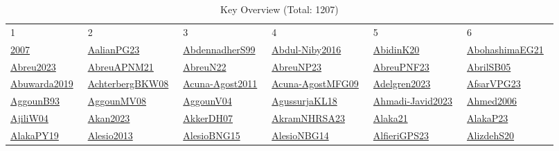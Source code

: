 \begin{longtable}{*{6}{l}}
\rowcolor{white}\caption{Key Overview (Total: 1207)}\\ \toprule
\rowcolor{white}1 & 2 & 3 & 4 & 5 & 6\\ \midrule
\endhead
\bottomrule
\endfoot
\href{../}{2007}~\cite{2007} & \href{../works/AalianPG23.pdf}{AalianPG23}~\cite{AalianPG23} & \href{../works/AbdennadherS99.pdf}{AbdennadherS99}~\cite{AbdennadherS99} & \href{../}{Abdul-Niby2016}~\cite{Abdul-Niby2016} & \href{../works/AbidinK20.pdf}{AbidinK20}~\cite{AbidinK20} & \href{../works/AbohashimaEG21.pdf}{AbohashimaEG21}~\cite{AbohashimaEG21}\\ 
\href{../}{Abreu2023}~\cite{Abreu2023} & \href{../works/AbreuAPNM21.pdf}{AbreuAPNM21}~\cite{AbreuAPNM21} & \href{../works/AbreuN22.pdf}{AbreuN22}~\cite{AbreuN22} & \href{../works/AbreuNP23.pdf}{AbreuNP23}~\cite{AbreuNP23} & \href{../works/AbreuPNF23.pdf}{AbreuPNF23}~\cite{AbreuPNF23} & \href{../works/AbrilSB05.pdf}{AbrilSB05}~\cite{AbrilSB05}\\ 
\href{../}{Abuwarda2019}~\cite{Abuwarda2019} & \href{../works/AchterbergBKW08.pdf}{AchterbergBKW08}~\cite{AchterbergBKW08} & \href{../}{Acuna-Agost2011}~\cite{Acuna-Agost2011} & \href{../works/Acuna-AgostMFG09.pdf}{Acuna-AgostMFG09}~\cite{Acuna-AgostMFG09} & \href{../works/Adelgren2023.pdf}{Adelgren2023}~\cite{Adelgren2023} & \href{../works/AfsarVPG23.pdf}{AfsarVPG23}~\cite{AfsarVPG23}\\ 
\href{../works/AggounB93.pdf}{AggounB93}~\cite{AggounB93} & \href{../}{AggounMV08}~\cite{AggounMV08} & \href{../}{AggounV04}~\cite{AggounV04} & \href{../works/AgussurjaKL18.pdf}{AgussurjaKL18}~\cite{AgussurjaKL18} & \href{../}{Ahmadi-Javid2023}~\cite{Ahmadi-Javid2023} & \href{../}{Ahmed2006}~\cite{Ahmed2006}\\ 
\href{../}{AjiliW04}~\cite{AjiliW04} & \href{../}{Akan2023}~\cite{Akan2023} & \href{../works/AkkerDH07.pdf}{AkkerDH07}~\cite{AkkerDH07} & \href{../works/AkramNHRSA23.pdf}{AkramNHRSA23}~\cite{AkramNHRSA23} & \href{../works/Alaka21.pdf}{Alaka21}~\cite{Alaka21} & \href{../works/AlakaP23.pdf}{AlakaP23}~\cite{AlakaP23}\\ 
\href{../works/AlakaPY19.pdf}{AlakaPY19}~\cite{AlakaPY19} & \href{../}{Alesio2013}~\cite{Alesio2013} & \href{../works/AlesioBNG15.pdf}{AlesioBNG15}~\cite{AlesioBNG15} & \href{../works/AlesioNBG14.pdf}{AlesioNBG14}~\cite{AlesioNBG14} & \href{../works/AlfieriGPS23.pdf}{AlfieriGPS23}~\cite{AlfieriGPS23} & \href{../}{AlizdehS20}~\cite{AlizdehS20}\\ 

\end{longtable}
